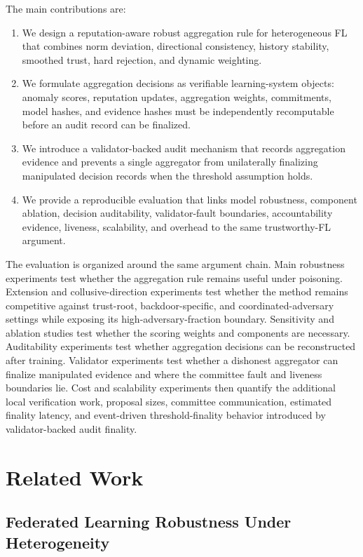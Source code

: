 \documentclass[preprint,12pt]{elsarticle}
\begin{document}
The main contributions are:
\begin{enumerate}
  \item We design a reputation-aware robust aggregation rule for heterogeneous FL that combines norm deviation, directional consistency, history stability, smoothed trust, hard rejection, and dynamic weighting.
  \item We formulate aggregation decisions as verifiable learning-system objects: anomaly scores, reputation updates, aggregation weights, commitments, model hashes, and evidence hashes must be independently recomputable before an audit record can be finalized.
  \item We introduce a validator-backed audit mechanism that records aggregation evidence and prevents a single aggregator from unilaterally finalizing manipulated decision records when the threshold assumption holds.
  \item We provide a reproducible evaluation that links model robustness, component ablation, decision auditability, validator-fault boundaries, accountability evidence, liveness, scalability, and overhead to the same trustworthy-FL argument.
\end{enumerate}

The evaluation is organized around the same argument chain. Main robustness experiments test whether the aggregation rule remains useful under poisoning. Extension and collusive-direction experiments test whether the method remains competitive against trust-root, backdoor-specific, and coordinated-adversary settings while exposing its high-adversary-fraction boundary. Sensitivity and ablation studies test whether the scoring weights and components are necessary. Auditability experiments test whether aggregation decisions can be reconstructed after training. Validator experiments test whether a dishonest aggregator can finalize manipulated evidence and where the committee fault and liveness boundaries lie. Cost and scalability experiments then quantify the additional local verification work, proposal sizes, committee communication, estimated finality latency, and event-driven threshold-finality behavior introduced by validator-backed audit finality.

\section{Related Work}

\subsection{Federated Learning Robustness Under Heterogeneity}
\end{document}
